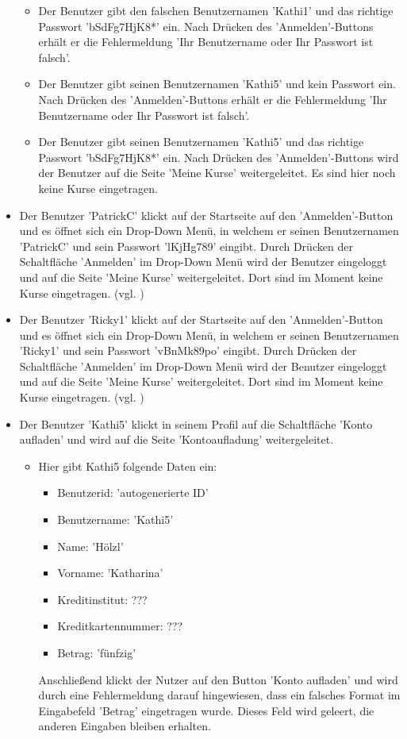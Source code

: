 \documentclass[a4paper]{scrreprt}
\begin{document}
\begin{itemize}
\begin{itemize}
				\item Der Benutzer gibt den falschen Benutzernamen 'Kathi1' und das richtige Passwort 'bSdFg7HjK8*' ein. Nach Drücken des 'Anmelden'-Buttons erhält er die Fehlermeldung 'Ihr Benutzername oder Ihr Passwort ist falsch'.
				\item Der Benutzer gibt seinen Benutzernamen 'Kathi5' und kein Passwort ein. Nach Drücken des 'Anmelden'-Buttons erhält er die Fehlermeldung 'Ihr Benutzername oder Ihr Passwort ist falsch'.
				\item Der Benutzer gibt seinen Benutzernamen 'Kathi5' und das richtige Passwort 'bSdFg7HjK8*' ein. Nach Drücken des 'Anmelden'-Buttons wird der Benutzer auf die Seite 'Meine Kurse' weitergeleitet. Es sind hier noch keine Kurse eingetragen.

			\end{itemize} 
			
			\item {} 
			Der Benutzer 'PatrickC' klickt auf der Startseite	auf den 'Anmelden'-Button und es öffnet sich ein Drop-Down Menü, in welchem er seinen Benutzernamen 'PatrickC' und sein Passwort 'lKjHg789' eingibt. Durch Drücken der Schaltfläche 'Anmelden' im Drop-Down Menü wird der Benutzer eingeloggt und auf die Seite 'Meine Kurse' weitergeleitet. Dort sind im Moment keine Kurse eingetragen. (vgl. )
			
			\item {} 
			Der Benutzer 'Ricky1' klickt auf der Startseite	auf den 'Anmelden'-Button und es öffnet sich ein Drop-Down Menü, in welchem er seinen Benutzernamen 'Ricky1' und sein Passwort 'vBnMk89po' eingibt. Durch Drücken der Schaltfläche 'Anmelden' im Drop-Down Menü wird der Benutzer eingeloggt und auf die Seite 'Meine Kurse' weitergeleitet. Dort sind im Moment keine Kurse eingetragen. (vgl. )
				
			\item {} 
			Der Benutzer 'Kathi5' klickt in seinem Profil auf die Schaltfläche 'Konto aufladen' und wird auf die Seite 'Kontoaufladung' weitergeleitet. 
				\begin{itemize}
					\item Hier gibt Kathi5 folgende Daten ein:
						 \begin{itemize}
						 	\item Benutzerid: 'autogenerierte ID'
						 	\item Benutzername: 'Kathi5'
						 	\item Name: 'Hölzl'
						 	\item Vorname: 'Katharina'
						 	\item Kreditinstitut: ???
						 	\item Kreditkartennummer: ???
						 	\item Betrag: 'fünfzig'
						 \end{itemize}
					Anschließend klickt der Nutzer auf den Button 'Konto aufladen' und wird durch eine Fehlermeldung darauf hingewiesen, dass ein falsches Format im Eingabefeld 'Betrag' eingetragen wurde. Dieses Feld wird geleert, die anderen Eingaben bleiben erhalten.
						

\end{itemize}
\end{itemize}
\end{document}
